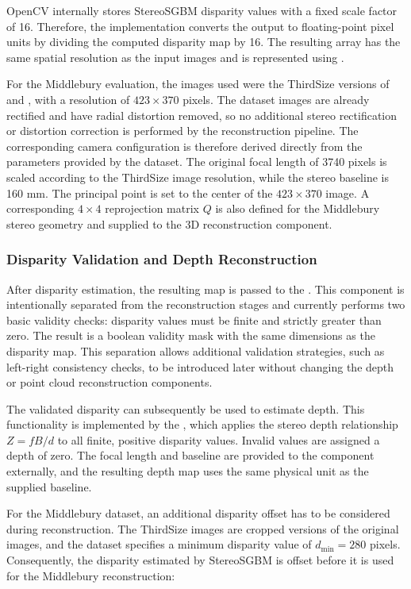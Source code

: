 OpenCV internally stores StereoSGBM disparity values with a fixed scale factor of 16. Therefore, the implementation converts the output to floating-point pixel units by dividing the computed disparity map by 16. The resulting array has the same spatial resolution as the input images and is represented using .

For the Middlebury evaluation, the images used were the ThirdSize versions of  and , with a resolution of \(423\times370\) pixels. The dataset images are already rectified and have radial distortion removed, so no additional stereo rectification or distortion correction is performed by the reconstruction pipeline. The corresponding camera configuration is therefore derived directly from the parameters provided by the dataset. The original focal length of 3740 pixels is scaled according to the ThirdSize image resolution, while the stereo baseline is 160 mm. The principal point is set to the center of the \(423\times370\) image. A corresponding \(4\times4\) reprojection matrix \(Q\) is also defined for the Middlebury stereo geometry and supplied to the 3D reconstruction component.

\subsubsection{Disparity Validation and Depth Reconstruction}

After disparity estimation, the resulting map is passed to the . This component is intentionally separated from the reconstruction stages and currently performs two basic validity checks: disparity values must be finite and strictly greater than zero. The result is a boolean validity mask with the same dimensions as the disparity map. This separation allows additional validation strategies, such as left-right consistency checks, to be introduced later without changing the depth or point cloud reconstruction components.

The validated disparity can subsequently be used to estimate depth. This functionality is implemented by the , which applies the stereo depth relationship \(Z=fB/d\) to all finite, positive disparity values. Invalid values are assigned a depth of zero. The focal length and baseline are provided to the component externally, and the resulting depth map uses the same physical unit as the supplied baseline.

For the Middlebury dataset, an additional disparity offset has to be considered during reconstruction. The ThirdSize images are cropped versions of the original images, and the dataset specifies a minimum disparity value of \(d_{\min}=280\) pixels. Consequently, the disparity estimated by StereoSGBM is offset before it is used for the Middlebury reconstruction:

